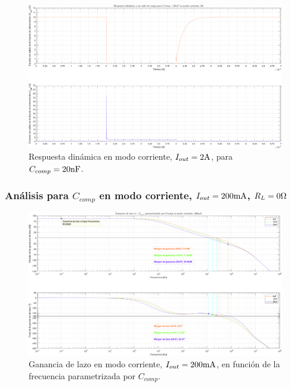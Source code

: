 \clearpage

\begin{figure}[H] %
\begin{center}
\includegraphics[width=1.1 \textwidth, angle=90]{./img/plots/dynamic/power_supply_CCOMP_20n_STEP_Modo3.png}
\caption{\label{fig:fig_power_supply_CCOMP_STEP_20n_Modo3}\footnotesize{Respuesta dinámica en modo corriente, $I_{out} = 2 \si[per-mode=symbol]{\ampere}$, para $C_{comp} = 20 \si[per-mode=symbol]{\nano\farad} $.}}
\end{center}
\end{figure}

\clearpage


\subsubsection{Análisis para $C_{comp}$ en modo corriente, $I_{out} = 200 \si[per-mode=symbol]{\milli\ampere}$, $R_{L} = 0 \si[per-mode=symbol]{\ohm}$}

\clearpage

\begin{figure}[H] %
\begin{center}
\includegraphics[width=1.1 \textwidth, angle=90]{./img/plots/loop/power_supply_CCOMP_LOOP_Modo4.png}
\caption{\label{fig:fig_power_supply_CCOMP_LOOP_Modo4}\footnotesize{Ganancia de lazo en modo corriente, $I_{out} = 200 \si[per-mode=symbol]{\milli\ampere}$, en función de la frecuencia parametrizada por $C_{comp}$.}}
\end{center}
\end{figure}


